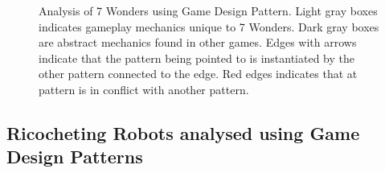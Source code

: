 \documentclass[a4paper]{article}
\begin{document}
\begin{figure}[htb]
\begin{tikzpicture}

  \end{tikzpicture}
\caption{Analysis of 7 Wonders using Game Design Pattern.
Light gray boxes indicates gameplay mechanics unique to 7 Wonders.
Dark gray boxes are abstract mechanics found in other games.
Edges with arrows indicate that the pattern being pointed to is instantiated by the other pattern connected to the edge.
Red edges indicates that at pattern is in conflict with another pattern.}

\label{fig:A7W}
\end{figure}

\newpage
\subsection{Ricocheting Robots analysed using Game Design Patterns}
\end{document}
